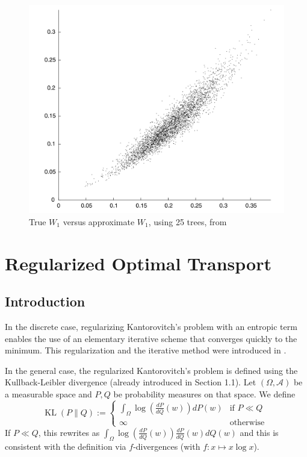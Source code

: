 \documentclass[12pt]{report}
\theoremstyle{definition}
\theoremstyle{remark}
\DeclareMathOperator{\kl}{KL}
\begin{document}
\begin{figure}[h!]
\centering
\includegraphics[scale=0.3]{leeb}
\caption{True $W_1$ versus approximate $W_1$, using 25 trees, from \cite{leeb2018approximating}}
\label{leeb}
\end{figure}

\chapter{Regularized Optimal Transport}

\section{Introduction}

\hspace{\parindent} In the discrete case, regularizing Kantorovitch's problem with an entropic term enables the use of an elementary iterative scheme that converges quickly to the minimum. This regularization and the iterative method were introduced in \cite{cuturi2013sinkhorn}.
\\
\par
In the general case, the regularized Kantorovitch's problem is defined using the Kullback-Leibler divergence (already introduced in Section 1.1). Let $(\Omega,\mathcal A)$ be a measurable space and $P,Q$ be probability measures on that space. We define $$\kl(P\|Q):= \begin{cases}
	\int_\Omega \log\left(\frac{dP}{dQ}(w) \right) dP(w) &\text{if } P\ll Q\\
	\infty &\text{otherwise }
\end{cases}$$
If $P\ll Q$, this rewrites as $\int_\Omega \log\left(\frac{dP}{dQ}(w) \right) \frac{dP}{dQ}(w) dQ(w)$ and this is consistent with the definition via $f$-divergences (with $f:x\mapsto x\log x$).
\end{document}

